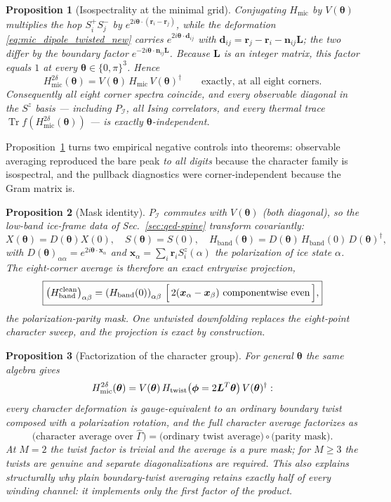 \documentclass[11pt,letterpaper]{article}
\newcommand{\bd}{\bm d}
\newcommand{\bn}{\bm n}
\newcommand{\bL}{\bm L}
\newcommand{\br}{\bm r}
\newcommand{\bphi}{\bm \phi}
\newcommand{\btheta}{\bm \theta}
\newcommand{\Tr}{\operatorname{Tr}}
\newcommand{\ice}{\mathcal I}
\newcommand{\HB}{H_{\mathrm{band}}}
\newcommand{\Hmic}{H_{\mathrm{mic}}}
\theoremstyle{plain}
\newtheorem{proposition}{Proposition}
\theoremstyle{definition}
\begin{document}
\begin{proposition}[Isospectrality at the minimal grid]
\label{prop:isospectral}
Conjugating $\Hmic$ by $V(\btheta)$ multiplies the hop $S_i^+S_j^-$ by
$e^{2i\btheta\cdot(\br_i-\br_j)}$, while the deformation
\eqref{eq:mic_dipole_twisted_new} carries $e^{2i\btheta\cdot\bd_{ij}}$ with
$\bd_{ij}=\br_j-\br_i-\bn_{ij}\bL$; the two differ by the boundary factor
$e^{-2i\btheta\cdot\bn_{ij}\bL}$.  Because $\bL$ is an integer matrix, this
factor equals $1$ at every $\btheta\in\{0,\pi\}^3$.  Hence
\[
\Hmic^{2\delta}(\btheta)=V(\btheta)\,\Hmic\,V(\btheta)^\dagger
\qquad\text{exactly, at all eight corners.}
\]
Consequently all eight corner spectra coincide, and every observable
diagonal in the $S^z$ basis --- including $P_\ice$, all Ising correlators,
and every thermal trace $\Tr f(\Hmic^{2\delta}(\btheta))$ --- is exactly
$\btheta$-independent.
\end{proposition}

Proposition~\ref{prop:isospectral} turns two empirical negative controls
into theorems: observable averaging reproduced the bare peak \emph{to all
digits} because the character family is isospectral, and the pullback
diagnostics were corner-independent because the Gram matrix is.

\begin{proposition}[Mask identity]
\label{prop:mask}
$P_\ice$ commutes with $V(\btheta)$ (both diagonal), so the low-band
ice-frame data of Sec.~\ref{sec:qed-spine} transform covariantly:
\[
X(\btheta)=D(\btheta)X(0),\quad
S(\btheta)=S(0),\quad
\HB(\btheta)=D(\btheta)\,\HB(0)\,D(\btheta)^\dagger,
\]
with $D(\btheta)_{\alpha\alpha}=e^{2i\btheta\cdot\bm x_\alpha}$ and
$\bm x_\alpha=\sum_i\br_i S_i^z(\alpha)$ the polarization of ice state
$\alpha$.  The eight-corner average is therefore an exact entrywise
projection,
\begin{equation}
\boxed{
\left(\HB^{\rm clean}\right)_{\alpha\beta}
=\left(\HB(0)\right)_{\alpha\beta}\,
\Big[\,2(\bm x_\alpha-\bm x_\beta)\ \text{componentwise even}\,\Big],
}
\label{eq:mask_identity}
\end{equation}
the \emph{polarization-parity mask}.  One untwisted downfolding replaces the
eight-point character sweep, and the projection is exact by construction.
\end{proposition}

\begin{proposition}[Factorization of the character group]
\label{prop:factorization}
For general $\btheta$ the same algebra gives
\[
\Hmic^{2\delta}(\btheta)
=V(\btheta)\,H_{\rm twist}\!\left(\bphi=2\bL^{T}\btheta\right)V(\btheta)^\dagger:
\]
every character deformation is gauge-equivalent to an ordinary boundary
twist composed with a polarization rotation, and the full character average
factorizes as
\[
\text{(character average over $\hat\Gamma$)}
=\text{(ordinary twist average)}\circ\text{(parity mask)} .
\]
At $M=2$ the twist factor is trivial and the average is a pure mask; for
$M\ge3$ the twists are genuine and separate diagonalizations are required.
This also explains \emph{structurally} why plain boundary-twist averaging
retains exactly half of every winding channel: it implements only the first
factor of the product.
\end{proposition}
\end{document}
